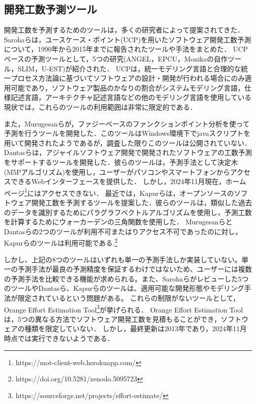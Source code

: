 \subsection{開発工数予測ツール}\label{既存ツール}
開発工数を予測するためのツールは，多くの研究者によって提案されてきた．
Sarohaら\cite{Saroha2015}は，ユースケース・ポイント(UCP)を用いたソフトウェア開発工数予測について，1990年から2015年までに報告されたツールや手法をまとめた．
UCPベースの予測ツールとして，5つの研究(ANGEL\cite{Shepperd1997}，EPCU\cite{Silva2008}，Monikaの自作ツール\cite{Monika2014}，SLIM\cite{Borade2013}，U-EST\cite{Kusumoto2004})が紹介された．
UCPは，統一モデリング言語と合理的な統一プロセス方法論に基づいてソフトウェアの設計・開発が行われる場合にのみ適用可能であり，ソフトウェア製品のかなりの割合がシステムモデリング言語，仕様記述言語，アーキテクチャ記述言語などの他のモデリング言語を使用している現状では，これらのツールの利用範囲は非常に限定的である．

また，Murugesanら\cite{Murugesan2015}が，ファジーベースのファンクションポイント分析を使って予測を行うツールを開発した．このツールはWindows環境下でjavaスクリプトを用いて開発されたようであるが，調査した限りこのツールは公開されていない．
Dantasら\cite{Dantas2019}は，アジャイルソフトウェア開発で開発されたソフトウェアの工数予測をサポートするツールを開発した．彼らのツールは，予測手法として決定木(M5Pアルゴリズム)を使用し，ユーザーがパソコンやスマートフォンからアクセスできるWebインターフェースを提供した．
しかし，2024年11月現在，ホームページ\footnote{https://mot-client-web.herokuapp.com/}にはアクセスできない．
最近では，Kapurら\cite{Kapur2022}は，オープンソースのソフトウェア開発工数を予測するツールを提案した．彼らのツールは，類似した過去のデータを識別するためにパラグラフベクトルアルゴリズムを使用し，予測工数を計算するためにウォーカーデンの三角関数を使用した．
Murugesanら\cite{Murugesan2015}とDantasら\cite{Dantas2019}の2つのツールが利用不可またはりアクセス不可であったのに対し，Kapurら\cite{Kapur2022}のツールは利用可能である.\footnote{https://doi.org/10.5281/zenodo.5095723}

しかし、上記の8つのツールはいずれも単一の予測手法しか実装していない。単一の予測手法が最良の予測精度を保証するわけではないため、ユーザーには複数の予測手法を比較できる機能が求められる。また、Sarohaら\cite{Saroha2015}がレビューした5つのツールやDantasら\cite{Dantas2019}、Kapurら\cite{Kapur2022}のツールは、適用可能な開発形態やモデリング手法が限定されているという問題がある。
これらの制限がないツールとして，Orange Effort Estimation Tool\footnote{https://sourceforge.net/projects/effort-estimate/}が挙げられる．
Orange Effort Estimation Tool\footnotemark[9]は，5つの異なる方法でソフトウェア開発工数を見積もることができ，ソフトウェアの種類を限定していない．
しかし，最終更新は2013年であり，2024年11月時点では実行できないようである．

